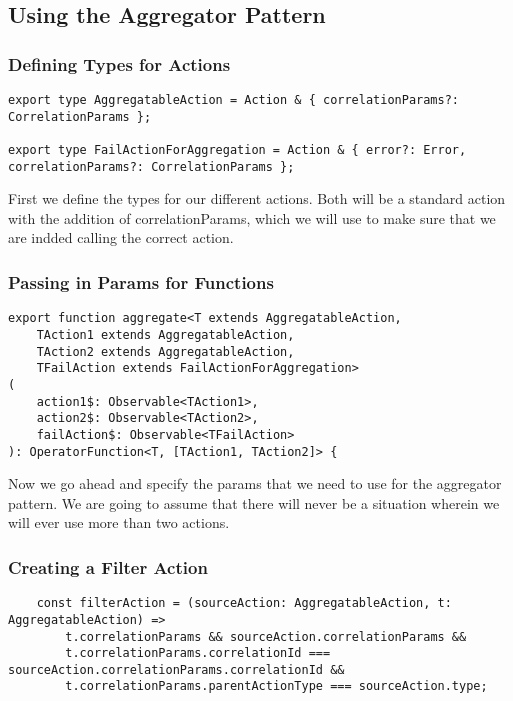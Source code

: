 \subsection{Using the Aggregator Pattern}


\subsubsection{Defining Types for Actions}
\begin{lstlisting}
export type AggregatableAction = Action & { correlationParams?: CorrelationParams };

export type FailActionForAggregation = Action & { error?: Error, correlationParams?: CorrelationParams };
\end{lstlisting}

First we define the types for our different actions. Both will be a standard
action with the addition of correlationParams, which we will use to make sure
that we are indded calling the correct action.

\subsubsection{Passing in Params for Functions}
\begin{lstlisting}
export function aggregate<T extends AggregatableAction,
    TAction1 extends AggregatableAction,
    TAction2 extends AggregatableAction,
    TFailAction extends FailActionForAggregation>
(
    action1$: Observable<TAction1>,
    action2$: Observable<TAction2>,
    failAction$: Observable<TFailAction>
): OperatorFunction<T, [TAction1, TAction2]> {
\end{lstlisting}
Now we go ahead and specify the params that we need to use for the aggregator
pattern. We are going to assume that there will never be a situation wherein
we will ever use more than two actions.

\subsubsection{ Creating a Filter Action }
\begin{lstlisting}
    const filterAction = (sourceAction: AggregatableAction, t: AggregatableAction) =>
        t.correlationParams && sourceAction.correlationParams &&
        t.correlationParams.correlationId === sourceAction.correlationParams.correlationId &&
        t.correlationParams.parentActionType === sourceAction.type;
\end{lstlisting}

